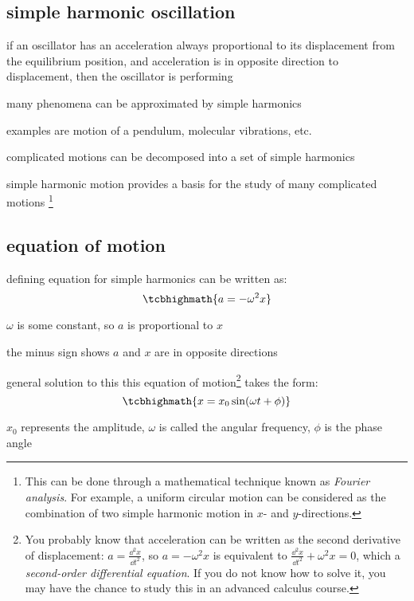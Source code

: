 \subsection{simple harmonic oscillation}

\begin{ilight}
	if an oscillator has an acceleration always proportional to its displacement from the equilibrium position, and acceleration is in opposite direction to displacement, then the oscillator is performing 
\end{ilight}

many phenomena can be approximated by simple harmonics

examples are motion of a pendulum, molecular vibrations, etc.

complicated motions can be decomposed into a set of simple harmonics

simple harmonic motion provides a basis for the study of many complicated motions
\footnote{This can be done through a mathematical technique known as \emph{Fourier analysis}. For example, a uniform circular motion can be considered as the combination of two simple harmonic motion in $x$- and $y$-directions.}

\subsection{equation of motion}

defining equation for simple harmonics can be written as: $$\tcbhighmath{a=-\omega^2 x}$$

$\omega$ is some constant, so $a$ is proportional to $x$

the minus sign shows $a$ and $x$ are in opposite directions

\vspace*{\baselineskip} 

general solution to this this equation of motion\footnote{You probably know that acceleration can be written as the second derivative of displacement: $a=\frac{\dd^2 x}{\dd t^2}$, so $a=-\omega^2 x$ is equivalent to $\frac{\dd^2 x}{\dd t^2} + \omega^2 x = 0$, which a \emph{second-order differential equation}. If you do not know how to solve it, you may have the chance to study this in an advanced calculus course.} takes the form: $$\tcbhighmath{x=x_0\sin(\omega t+\phi)}$$

$x_0$ represents the amplitude, $\omega$ is called the angular frequency, $\phi$ is the phase angle

